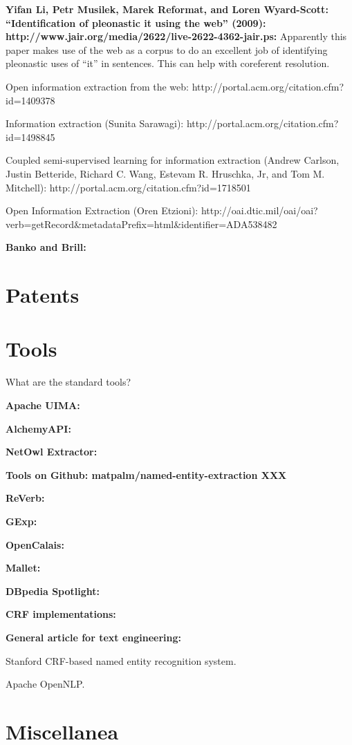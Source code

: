 \textbf{Yifan Li, Petr Musilek, Marek Reformat, and Loren Wyard-Scott:
  ``Identification of pleonastic it using the web'' (2009):
  http://www.jair.org/media/2622/live-2622-4362-jair.ps:} Apparently
this paper makes use of the web as a corpus to do an excellent job of
identifying pleonastic uses of ``it'' in sentences.  This can help
with coreferent resolution.

Open information extraction from the web:
http://portal.acm.org/citation.cfm?id=1409378

Information extraction (Sunita Sarawagi):
http://portal.acm.org/citation.cfm?id=1498845

Coupled semi-supervised learning for information extraction (Andrew
Carlson, Justin Betteride, Richard C. Wang, Estevam R. Hruschka, Jr,
and Tom M. Mitchell): http://portal.acm.org/citation.cfm?id=1718501

Open Information Extraction (Oren Etzioni):
http://oai.dtic.mil/oai/oai?verb=getRecord\&metadataPrefix=html\&identifier=ADA538482


\textbf{Banko and Brill:}

\section{Patents}


\section{Tools}

What are the standard tools?

\textbf{Apache UIMA:}

\textbf{AlchemyAPI:}

\textbf{NetOwl Extractor:}

\textbf{Tools on Github: matpalm/named-entity-extraction XXX}

\textbf{ReVerb:}

\textbf{GExp:}

\textbf{OpenCalais:}

\textbf{Mallet:}

\textbf{DBpedia Spotlight:}

\textbf{CRF implementations:}

\textbf{General article for text engineering:}

Stanford CRF-based named entity recognition system.

Apache OpenNLP.

\section{Miscellanea}

